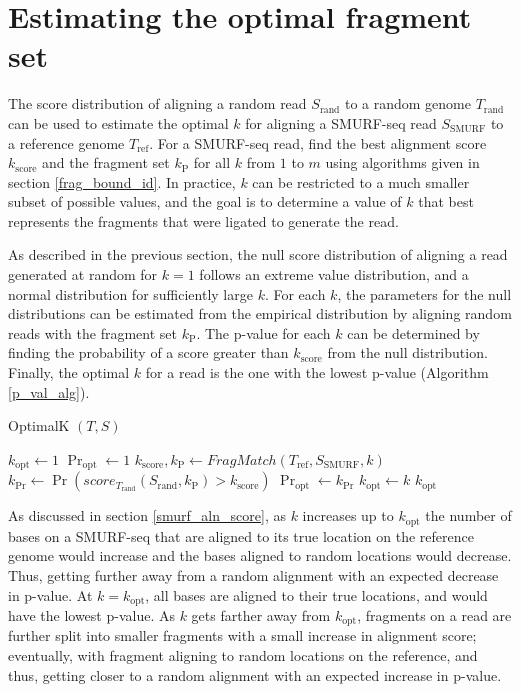 \section{Estimating the optimal fragment set}
The score distribution of aligning a random read $S_\mathrm{rand}$ to a
random genome $T_\mathrm{rand}$ can be used to estimate the optimal $k$
for aligning a SMURF-seq read $S_\mathrm{SMURF}$ to a reference genome
$T_\mathrm{ref}$.
For a SMURF-seq read, find the
best alignment score $k_\mathrm{score}$ and the fragment set
$k_\mathrm{P}$ for all $k$ from $1$ to $m$ using algorithms given in
section \ref{frag_bound_id}. In practice, $k$ can be restricted to a
much smaller subset of possible values, and the goal is to determine a
value of $k$ that best represents the fragments that were ligated to
generate the read.
%

As described in the previous section, the null score distribution of
aligning a read generated at random for $k=1$ follows an extreme value
distribution, and a normal distribution for sufficiently large $k$.  For
each $k$, the parameters for the null distributions can be estimated
from the empirical distribution by aligning random reads with the
fragment set $k_\mathrm{P}$.
%
The p-value for each $k$ can be determined by finding the probability of
a score greater than $k_\mathrm{score}$ from the null distribution.
Finally, the optimal $k$ for a read is the one with the lowest p-value
(Algorithm \ref{p_val_alg}).

\begin{algorithm}[H]
\caption{OptimalK $(T,S)$}
\begin{algorithmic}[1]
  \STATE $k_\mathrm{opt} \leftarrow 1$
  \STATE $\Pr_\mathrm{opt} \leftarrow 1$
    \STATE $k_\mathrm{score}, k_\mathrm{P} \leftarrow
              FragMatch(T_\mathrm{ref},S_\mathrm{SMURF},k)$
    \STATE $k_{\Pr} \leftarrow \Pr(score_{T_\mathrm{rand}}
              (S_\mathrm{rand},k_\mathrm{P}) > k_\mathrm{score})$
      \STATE $\Pr_\mathrm{opt} \leftarrow k_{\Pr}$
      \STATE $k_\mathrm{opt} \leftarrow k$
    \ENDIF
  \ENDFOR
  \RETURN $k_\mathrm{opt}$
\end{algorithmic}
\label{p_val_alg}
\end{algorithm}

As discussed in section \ref{smurf_aln_score}, as $k$ increases up to
$k_\mathrm{opt}$ the number of bases on a SMURF-seq that are aligned to
its true location on the reference genome would increase and the bases
aligned to random locations would decrease. Thus, getting further away
from a random alignment with an expected decrease in p-value. At $k =
k_\mathrm{opt}$, all bases are aligned to their true locations, and
would have the lowest p-value. As $k$ gets farther away from
$k_\mathrm{opt}$, fragments on a read are further split into smaller
fragments with a small increase in alignment score; eventually, with
fragment aligning to random locations on the reference, and thus,
getting closer to a random alignment with an expected increase in
p-value.

